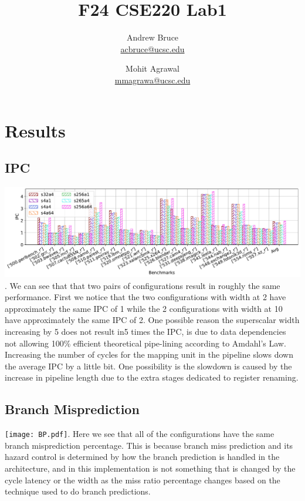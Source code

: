 \documentclass{article}
\title{F24 CSE220 Lab1}
\author{
  Andrew Bruce \\ \href{mailto:acbruce@ucsc.edu}{acbruce@ucsc.edu} \and
  Mohit Agrawal \\ \href{mailto:mmagrawa@ucsc.edu}{mmagrawa@ucsc.edu}
}
\begin{document}
\maketitle

\section*{Results}
\subsection*{IPC}
\includegraphics[width=\textwidth]{IPC.pdf}.
We can see that that two pairs of configurations result in roughly the same performance. First we notice that the two configurations with width at 2 have approximately the same IPC of 1 while the 2 configurations with width at 10 have approximately the same IPC of 2. One possible reason the superscalar width increasing by 5 does not result in5 times the IPC, is due to data dependencies not allowing 100\% efficient theoretical pipe-lining according to Amdahl's Law. Increasing the number of cycles for the mapping unit in the pipeline slows down the average IPC by a little bit. One possibility is the slowdown is caused by the increase in pipeline length due to the extra stages dedicated to register renaming.
\subsection*{Branch Misprediction}
\texttt{[image: BP.pdf]}.
Here we see that all of the configurations have the same branch misprediction percentage. This is because branch miss prediction and its hazard control is determined by how the branch prediction is handled in the architecture, and in this implementation is not something that is changed by the cycle latency or the width as the miss ratio percentage changes based on the technique used to do branch predictions.
\end{document}
